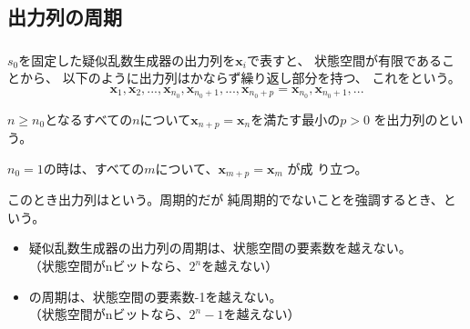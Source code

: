\documentclass[cjk, dvips, handout, trans, xcolor=dvipsnames]{beamer}
\def\bx{{{\mathbf x}}}
\begin{document}
\subsection{出力列の周期}
\begin{frame}[t]
  \frametitle{\insertsubsection}
  $s_0$を固定した疑似乱数生成器の出力列を$\bx_i$で表すと、
  状態空間が有限であることから、
  以下のように出力列はかならず繰り返し部分を持つ、
  これをという。
  \[
  \bx_1, \bx_2, ..., \bx_{n_0}, \bx_{n_0 + 1}, ..., \bx_{n_0 + p} = \bx_{n_0},
  \bx_{n_0+1}, ...
  \]

  \pause
  $n \ge n_0$となるすべての$n$について$\bx_{n + p} = \bx_{n}$を満たす最小の$p > 0$
  を出力列のという。

  \pause
  $n_0 = 1$の時は、すべての$m$について、$\bx_{m + p} = \bx_m$ が成
  り立つ。

  このとき出力列はという。周期的だが
  純周期的でないことを強調するとき、と
  いう。

  \begin{itemize}
    \item 疑似乱数生成器の出力列の周期は、状態空間の要素数を越えない。\\
      （状態空間がnビットなら、$2^n$を越えない）
    \item \FLPRNG の周期は、状態空間の要素数-1を越えない。\\
      （状態空間がnビットなら、$2^n-1$を越えない）
  \end{itemize}
\end{frame}
\end{document}
